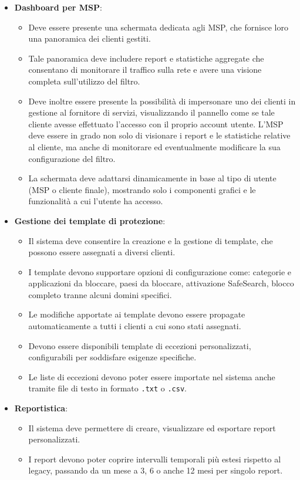 \begin{itemize}
  \item \textbf{Dashboard per MSP}:
    \begin{itemize}
      \item Deve essere presente una schermata dedicata agli MSP, che fornisce loro una panoramica dei clienti gestiti.
      \item Tale panoramica deve includere report e statistiche aggregate che consentano di monitorare il traffico sulla rete e avere una visione completa sull'utilizzo del filtro.
      \item Deve inoltre essere presente la possibilità di impersonare uno dei clienti in gestione al fornitore di servizi, visualizzando il pannello come se tale cliente avesse effettuato l'accesso con il proprio account utente. L’MSP deve essere in grado non solo di visionare i report e le statistiche relative al cliente, ma anche di monitorare ed eventualmente modificare la sua configurazione del filtro.
      \item La schermata deve adattarsi dinamicamente in base al tipo di utente (MSP o cliente finale), mostrando solo i componenti grafici e le funzionalità a cui l’utente ha accesso.
    \end{itemize}

  \item \textbf{Gestione dei template di protezione}:
    \begin{itemize}
      \item Il sistema deve consentire la creazione e la gestione di template, che possono essere assegnati a diversi clienti.
      \item I template devono supportare opzioni di configurazione come: categorie e applicazioni da bloccare, paesi da bloccare, attivazione SafeSearch, blocco completo tranne alcuni domini specifici.
      \item Le modifiche apportate ai template devono essere propagate automaticamente a tutti i clienti a cui sono stati assegnati.
      \item Devono essere disponibili template di eccezioni personalizzati, configurabili per soddisfare esigenze specifiche.
      \item Le liste di eccezioni devono poter essere importate nel sistema anche tramite file di testo in formato \texttt{.txt} o \texttt{.csv}.
    \end{itemize}

  \item \textbf{Reportistica}:
    \begin{itemize}
      \item Il sistema deve permettere di creare, visualizzare ed esportare report personalizzati.
      \item I report devono poter coprire intervalli temporali più estesi rispetto al legacy, passando da un mese a 3, 6 o anche 12 mesi per singolo report.
    \end{itemize}


\end{itemize}
